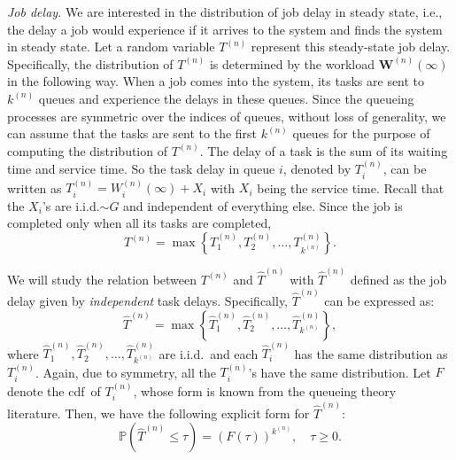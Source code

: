 \documentclass[sigconf]{acmart}
\renewcommand{\Pr}{\mathbb{P}} %
\newcommand{\cdf}{cdf}
\newcommand{\supn}{^{(n)}}
\begin{document}
\emph{Job delay.}
We are interested in the distribution of job delay in steady state, i.e., the delay a job would experience if it arrives to the system and finds the system in steady state.  Let a random variable $T\supn$ represent this steady-state job delay.  Specifically, the distribution of $T\supn$ is determined by the workload $\bm{W}\supn(\infty)$ in the following way.  When a job comes into the system, its tasks are sent to $k\supn$ queues and experience the delays in these queues.  Since the queueing processes are symmetric over the indices of queues, without loss of generality, we can assume that the tasks are sent to the first $k\supn$ queues for the purpose of computing the distribution of $T\supn$.  The delay of a task is the sum of its waiting time and service time.  So the task delay in queue $i$, denoted by $T\supn_i$, can be written as $T\supn_i=W\supn_i(\infty)+X_i$ with $X_i$ being the service time.  Recall that the $X_i$'s are i.i.d.$\sim G$ and independent of everything else.  Since the job is completed only when all its tasks are completed,
\begin{equation}\label{eq:T}
T\supn = \max\left\{T\supn_1,T\supn_2,\dots,T\supn_{k\supn}\right\}.
\end{equation}



We will study the relation between $T\supn$ and $\hat{T}\supn$ with $\hat{T}\supn$ defined as the job delay given by \emph{independent} task delays.  Specifically, $\hat{T}\supn$ can be expressed as:
\begin{equation}\label{eq:That}
\hat{T}\supn=\max\left\{\hat{T}\supn_1,\hat{T}\supn_2,\dots,\hat{T}\supn_{k\supn}\right\},
\end{equation}
where $\hat{T}\supn_1,\hat{T}\supn_2,\dots,\hat{T}\supn_{k\supn}$ are i.i.d.\ and each $\hat{T}\supn_i$ has the same distribution as $T\supn_i$. 
Again, due to symmetry, all the $T\supn_i$'s have the same distribution. Let $F$ denote the \cdf\ of $T\supn_i$, whose form is known from the queueing theory literature.  Then, we have the following explicit form for $\hat{T}\supn$:
\begin{equation}
\Pr\left(\hat{T}\supn\le \tau\right)=\left(F(\tau)\right)^{k\supn},\quad \tau\ge 0.
\end{equation}
\end{document}

